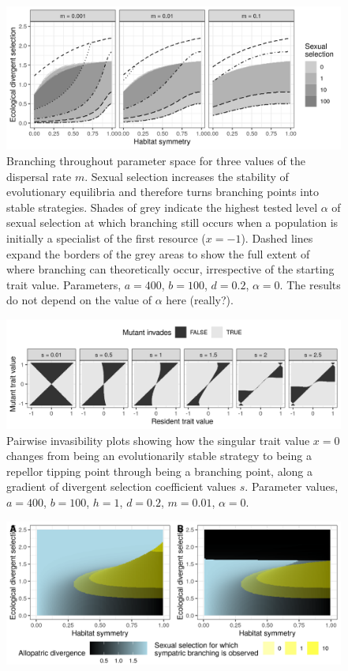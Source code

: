 \begin{figure}
    \centering
    \includegraphics[width=\textwidth]{figures/map_branching_points}
    \caption{Branching throughout parameter space for three values of the dispersal rate $m$. Sexual selection increases the stability of evolutionary equilibria and therefore turns branching points into stable strategies. Shades of grey indicate the highest tested level $\alpha$ of sexual selection at which branching still occurs when a population is initially a specialist of the first resource ($x = -1$). Dashed lines expand the borders of the grey areas to show the full extent of where branching can theoretically occur, irrespective of the starting trait value. Parameters, $a = 400$, $b = 100$, $d = 0.2$, $\alpha = 0$. The results do not depend on the value of $\alpha$ here (really?).}
    \label{fig:map_branching_points}
\end{figure}

\begin{figure}
    \centering
    \includegraphics[width=\textwidth]{figures/pairwise_invasibility_plots}
    \caption{Pairwise invasibility plots showing how the singular trait value $x = 0$ changes from being an evolutionarily stable strategy to being a repellor tipping point through being a branching point, along a gradient of divergent selection coefficient values $s$. Parameter values, $a = 400$, $b = 100$, $h = 1$, $d = 0.2$, $m = 0.01$, $\alpha = 0$.}
    \label{fig:pairwise_invasibility}
\end{figure}

\begin{figure}
    \centering
    \includegraphics[width=\textwidth]{figures/divergence_across_patches}
     \label{fig:map_divergence}
\end{figure}